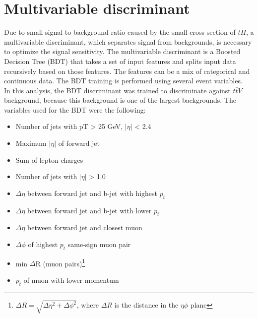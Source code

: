 

\pagebreak
\section{Multivariable discriminant}
Due to small signal to background ratio caused by the small cross section of $tH$, a multivariable discriminant, which separates signal from backgrounds, is necessary to optimize the signal sensitivity. The multivariable discriminant is a Boosted Decision Tree (BDT) that takes a set of input features and splits input data recursively based on those features. The features can be a mix of categorical and continuous data.
The BDT training is performed using several event variables.
\\

In this analysis, the BDT discriminant was trained to discriminate against $t\bar{t}V$ background, because this background is one of the largest backgrounds. The variables used for the BDT were the following:

\begin{itemize}
\item Number of jets with pT > 25 GeV, $|\eta|$ < 2.4
\item Maximum $|\eta|$ of forward jet
\item Sum of lepton charges
\item Number of jets with $|\eta|$ > 1.0
\item $\Delta\eta$ between forward jet and b-jet with highest $p_t$
\item $\Delta\eta$ between forward jet and b-jet with lower $p_t$
\item $\Delta\eta$ between forward jet and closest muon
\item $\Delta\phi$ of highest $p_t$ same-sign muon pair
\item min $\Delta$R (muon pairs)\footnote{$\Delta R = \sqrt{ \Delta\eta^2 + \Delta\phi^2}$, where $\Delta R$ is the distance in the $\eta \phi$ plane}
\item $p_t$ of muon with lower momentum
\end{itemize}

